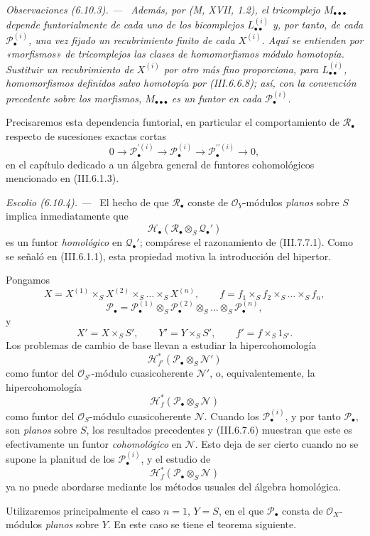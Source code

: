 \documentclass[10pt,oneside]{book}
\newcommand{\sh}[1]{\mathscr{#1}}
\newcommand{\sref}[2][]{\textup{(#2)}}
\newenvironment{remarks}[1][]{\par\medskip\noindent\itshape Observaciones (#1). ---\ }{\par}
\newenvironment{scholium}[1][]{\par\medskip\noindent\textit{Escolio (#1). ---\ }}{\par}
\begin{document}
\begin{remarks}[6.10.3]
Además, por (M, XVII, 1.2), el tricomplejo
$M_{\bullet\bullet\bullet}$ depende \emph{funtorialmente} de cada uno de
los bicomplejos $L_{\bullet\bullet}^{(i)}$ y, por tanto, de cada
$\sh P_\bullet^{(i)}$, una vez fijado un recubrimiento finito de
cada $X^{(i)}$. Aquí se entienden por «morfismos» de tricomplejos
las \emph{clases de homomorfismos} módulo homotopía. Sustituir un
recubrimiento de $X^{(i)}$ por otro más fino proporciona, para
$L_{\bullet\bullet}^{(i)}$, homomorfismos definidos salvo
homotopía por \sref{III.6.6.8}; así, con la convención precedente
sobre los morfismos, $M_{\bullet\bullet\bullet}$ es un \emph{funtor} en
cada $\sh P_\bullet^{(i)}$.

Precisaremos esta dependencia funtorial, en particular el
comportamiento de $\sh R_\bullet$ respecto de sucesiones exactas
cortas
\[
  0\longrightarrow\sh P_\bullet^{\prime(i)}
  \longrightarrow\sh P_\bullet^{(i)}
  \longrightarrow\sh P_\bullet^{\prime\prime(i)}
  \longrightarrow0,
\]
en el capítulo dedicado a un álgebra general de funtores
cohomológicos mencionado en \sref{III.6.1.3}.
\end{remarks}

\begin{scholium}[6.10.4]
\label{III.6.10.4}
El hecho de que $\sh R_\bullet$ conste de $\sh O_Y$-módulos
\emph{planos} sobre $S$ implica inmediatamente que
\[
  \sh H_\bullet
  (\sh R_\bullet\otimes_S\sh Q_\bullet')
\]
es un funtor \emph{homológico} en $\sh Q_\bullet'$; compárese el
razonamiento de \sref{III.7.7.1}. Como se señaló en
\sref{III.6.1.1}, esta propiedad motiva la introducción del
hipertor.

Pongamos
\[
  X=X^{(1)}\times_SX^{(2)}\times_S\ldots\times_SX^{(n)},
  \qquad
  f=f_1\times_Sf_2\times_S\ldots\times_Sf_n,
\]
\[
  \sh P_\bullet
  =
  \sh P_\bullet^{(1)}
  \otimes_S\sh P_\bullet^{(2)}
  \otimes_S\ldots\otimes_S\sh P_\bullet^{(n)},
\]
y
\[
  X'=X\times_SS',
  \qquad
  Y'=Y\times_SS',
  \qquad
  f'=f\times_S1_{S'}.
\]
Los problemas de cambio de base llevan a estudiar la
hipercohomología
\[
  \sh H^*_{f'}
  (\sh P_\bullet\otimes_S\sh N')
\]
como funtor del $\sh O_{S'}$-módulo cuasicoherente $\sh N'$, o,
equivalentemente, la hipercohomología
\[
  \sh H^*_f
  (\sh P_\bullet\otimes_S\sh N)
\]
como funtor del $\sh O_S$-módulo cuasicoherente $\sh N$. Cuando
los $\sh P_\bullet^{(i)}$, y por tanto $\sh P_\bullet$, son
\emph{planos} sobre $S$, los resultados precedentes y
\sref{III.6.7.6} muestran que este es efectivamente un funtor
\emph{cohomológico} en $\sh N$. Esto deja de ser cierto cuando no se
supone la planitud de los $\sh P_\bullet^{(i)}$, y el estudio de
\[
  \sh H^*_f(\sh P_\bullet\otimes_S\sh N)
\]
ya no puede abordarse mediante los métodos usuales del álgebra
homológica.

Utilizaremos principalmente el caso $n=1$, $Y=S$, en el que
$\sh P_\bullet$ consta de $\sh O_X$-módulos \emph{planos} sobre $Y$.
En este caso se tiene el teorema siguiente.
\end{scholium}
\end{document}

